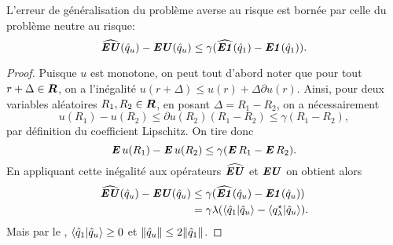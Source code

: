 \begin{lemme}
L'erreur de généralisation du problème averse au risque est bornée par celle du problème
neutre au risque:
\begin{equation}
  \hEU(\qu) - \EU(\qu) \leq \gamma(\hEN(\qn) - \EN(\qn)).
\end{equation}
\end{lemme}
\begin{proof}
  Puisque $u$ est monotone, on peut tout d'abord noter que pour tout $r+\Delta \in \R$, on a
  l'inégalité $u(r+\Delta) \leq u(r) + \Delta \partial u(r)$. Ainsi, pour deux variables aléatoires $R_1,R_2 \in
  \R$, en posant $\Delta = R_1-R_2$, on a nécessairement
  \begin{equation}
    u(R_1) - u(R_2) \leq \partial u(R_2) (R_1 -R_2) \leq \gamma(R_1 - R_2),
  \end{equation}
  par définition du coefficient Lipschitz. On tire donc
  \begin{equation}
    \E u(R_1) - \E u(R_2) \leq \gamma(\E R_1 - \E R_2). 
  \end{equation}
  En appliquant cette inégalité aux opérateurs $\hEU$ et $\EU$ on obtient alors
  \begin{align}
    \hEU(\qu) - \EU(\qu) &\leq \gamma(\hEN(\qu) - \EN(\qu))\\
                         &= \gamma\lambda(\braket{\qh_1|\qu} - \braket{\qsl|\qu}).
  \end{align}
  Mais par le , $\braket{\qh_1|\qu} \geq 0$ et $\|\qu\| \leq 2\|\qh_1\|$. 
\end{proof}




